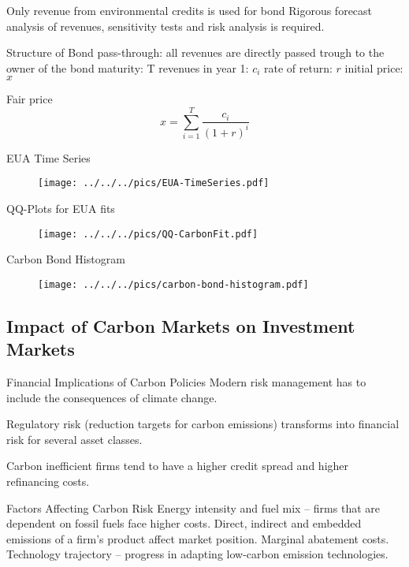 	Only revenue from environmental credits is used for bond
		Rigorous forecast analysis of revenues, sensitivity tests and risk analysis is required.


Structure of Bond
	pass-through: all revenues are directly passed trough to the owner of the bond
		maturity: T
		revenues in year 1: $c_i$
		rate of return: $r$
		initial price: $x$

	Fair price
		$$
		x= \sum_{i=1}^T \frac{c_i}{(1+r)^i}
		$$


EUA Time Series
	\begin{figure}[h!]
	\centering
	\texttt{[image: ../../../pics/EUA-TimeSeries.pdf]}
	\label{fig:EUA-TS}
	\end{figure}

QQ-Plots for EUA fits
	\begin{figure}[h!]
	\centering
	\texttt{[image: ../../../pics/QQ-CarbonFit.pdf]}
	\label{fig:EUA-fits}
	\end{figure}

Carbon Bond Histogram
	\begin{figure}[h!]
	\centering
	\texttt{[image: ../../../pics/carbon-bond-histogram.pdf]}
	\label{fig:Carbon-Bond-Histogram}
	\end{figure}


\subsection{Impact of Carbon Markets on Investment Markets}

Financial Implications of Carbon Policies
	Modern risk management has to include the consequences of climate change.
	
	Regulatory risk (reduction targets for carbon emissions) transforms into financial risk  for several asset classes.
	
	Carbon inefficient firms tend to have a higher credit spread and higher refinancing costs.


Factors Affecting Carbon Risk
	Energy intensity and fuel mix -- firms that are dependent on fossil fuels face higher costs.
	Direct, indirect and embedded emissions of a firm's product affect market position.
	Marginal abatement costs.
	Technology trajectory -- progress in adapting low-carbon emission technologies.


